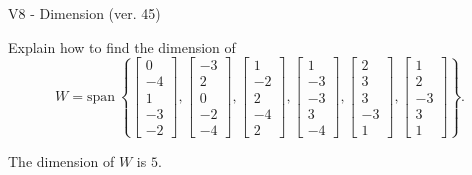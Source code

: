 \begin{exercise}
  \begin{exerciseTitle}V8 - Dimension (ver. 45)\end{exerciseTitle}
  \begin{exerciseStatement}
    Explain how to find the dimension of 
\[W=\mathrm{span}\ \left\{\left[\begin{array}{r}
0 \\
-4 \\
1 \\
-3 \\
-2
\end{array}\right] , \left[\begin{array}{r}
-3 \\
2 \\
0 \\
-2 \\
-4
\end{array}\right] , \left[\begin{array}{r}
1 \\
-2 \\
2 \\
-4 \\
2
\end{array}\right] , \left[\begin{array}{r}
1 \\
-3 \\
-3 \\
3 \\
-4
\end{array}\right] , \left[\begin{array}{r}
2 \\
3 \\
3 \\
-3 \\
1
\end{array}\right] , \left[\begin{array}{r}
1 \\
2 \\
-3 \\
3 \\
1
\end{array}\right]\right\}.\]



  \end{exerciseStatement}
  \begin{exerciseAnswer}
   The dimension of \(W\) is  \(5\).
  


  \end{exerciseAnswer}
\end{exercise}